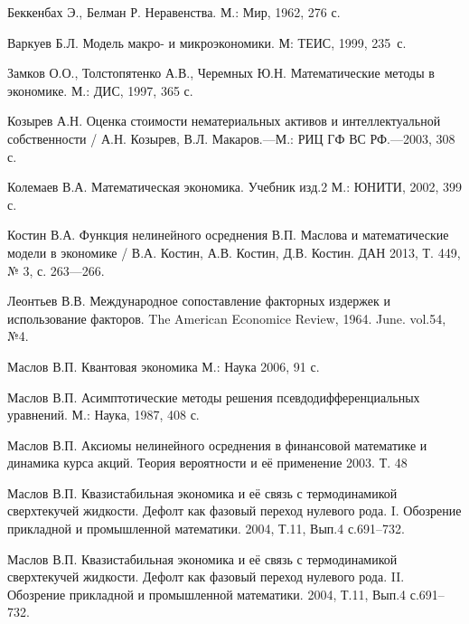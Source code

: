 \documentclass[12pt,openbib]{report}
\begin{document}
\begin{thebibliography}{12}

Беккенбах Э., Белман Р. Неравенства. М.: Мир, 1962, 276 с.

Варкуев Б.Л. Модель макро- и микроэкономики. М: ТЕИС, 1999, 235~с.

Замков О.О., Толстопятенко А.В., Черемных Ю.Н. Математические методы в экономике. М.: ДИС, 1997, 365 с.

Козырев А.Н. Оценка стоимости нематериальных активов и интеллектуальной собственности / А.Н. Козырев, В.Л. Макаров.---М.: РИЦ ГФ ВС РФ.---2003, 308 с.

Колемаев В.А. Математическая экономика. Учебник изд.2 М.: ЮНИТИ, 2002, 399 с.

Костин В.А. Функция нелинейного осреднения В.П. Маслова и математические модели в экономике /
В.А. Костин, А.В. Костин, Д.В. Костин. ДАН 2013, Т. 449, № 3, с. 263---266.

Леонтьев В.В. Международное сопоставление факторных издержек и использование факторов. The American Economice Review, 1964. June. vol.54, №4.

Маслов В.П. Квантовая экономика М.: Наука 2006, 91 с.

Маслов В.П. Асимптотические методы решения псевдодифференциальных уравнений. М.: Наука, 1987, 408 с.

Маслов В.П. Аксиомы нелинейного осреднения в финансовой математике и динамика курса акций. Теория вероятности и её применение 2003. Т. 48

Маслов В.П. Квазистабильная экономика и её связь с термодинамикой сверхтекучей жидкости.
Дефолт как фазовый переход нулевого рода. I. Обозрение прикладной и промышленной математики. 2004, Т.11, Вып.4 с.691--732.

Маслов В.П. Квазистабильная экономика и её связь с термодинамикой сверхтекучей жидкости.
Дефолт как фазовый переход нулевого рода. II. Обозрение прикладной и промышленной математики. 2004, Т.11, Вып.4 с.691--732.

\end{thebibliography}
\end{document}
